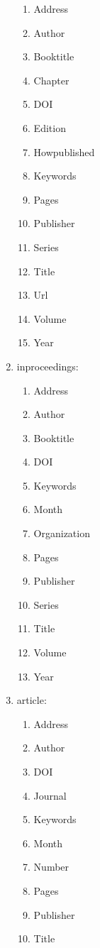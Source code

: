 \documentclass[letter,12pt]{article}
\begin{document}
\begin{enumerate}
	\begin{enumerate} \itemsep -2pt
	\item Address
	\item Author
	\item Booktitle
	\item Chapter
	\item DOI
	\item Edition
	\item Howpublished
	\item Keywords
	\item Pages
	\item Publisher
	\item Series
	\item Title
	\item Url
	\item Volume
	\item Year
	\end{enumerate}
\item inproceedings: \vspace{-0.3cm}
	\begin{enumerate} \itemsep -2pt
	\item Address
	\item Author
	\item Booktitle
	\item DOI
	\item Keywords
	\item Month
	\item Organization
	\item Pages
	\item Publisher
	\item Series
	\item Title
	\item Volume
	\item Year
	\end{enumerate}
\item article: \vspace{-0.3cm}
	\begin{enumerate} \itemsep -2pt
	\item Address
	\item Author
	\item DOI
	\item Journal
	\item Keywords
	\item Month
	\item Number
	\item Pages
	\item Publisher
	\item Title

\end{enumerate}
\end{enumerate}
\end{document}
